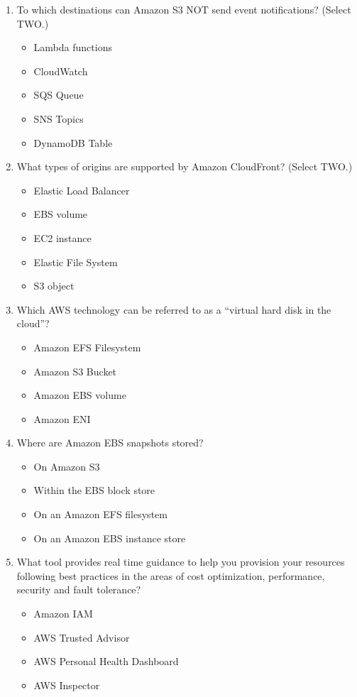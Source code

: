 \begin{enumerate}
	\item To which destinations can Amazon S3 NOT send event notifications? (Select TWO.)
	\begin{itemize}
		\item Lambda functions
		\item CloudWatch
		\item SQS Queue
		\item SNS Topics
		\item DynamoDB Table
	\end{itemize}

	\item What types of origins are supported by Amazon CloudFront? (Select TWO.)
	\begin{itemize}
		\item Elastic Load Balancer
		\item EBS volume
		\item EC2 instance
		\item Elastic File System
		\item S3 object
	\end{itemize}

	\item Which AWS technology can be referred to as a “virtual hard disk in the cloud”?
	\begin{itemize}
		\item Amazon EFS Filesystem
		\item Amazon S3 Bucket
		\item Amazon EBS volume
		\item Amazon ENI
	\end{itemize}

	\item Where are Amazon EBS snapshots stored?
	\begin{itemize}
		\item On Amazon S3
		\item Within the EBS block store
		\item On an Amazon EFS filesystem
		\item On an Amazon EBS instance store
	\end{itemize}

	\item What tool provides real time guidance to help you provision your resources following best practices in the areas of cost optimization, performance, security and fault tolerance?
	\begin{itemize}
		\item Amazon IAM
		\item AWS Trusted Advisor
		\item AWS Personal Health Dashboard
		\item AWS Inspector
	\end{itemize}


\end{enumerate}

